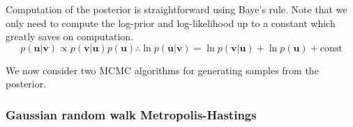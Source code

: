 \documentclass[11pt]{article}
\begin{document}
Computation of the posterior is straightforward using Baye's rule. Note that we only need to compute the log-prior and log-likelihood up to a constant which greatly saves on computation.
\begin{equation}
    p(\boldsymbol{u} | \boldsymbol{v}) \propto p(\boldsymbol{v} | \boldsymbol{u}) p(\boldsymbol{u}) \therefore \ln p(\boldsymbol{u} | \boldsymbol{v}) = \ln p(\boldsymbol{v} | \boldsymbol{u}) + \ln p(\boldsymbol{u}) + \text{const}
\end{equation}

We now consider two MCMC algorithms for generating samples from the posterior.

\subsubsection{Gaussian random walk Metropolis-Hastings}
\end{document}
